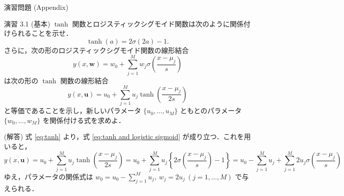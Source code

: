 \documentclass[uplatex,11pt,dvipdfmx,aspectratio=169,unicode,t]{beamer}
\numberwithin{equation}{section}
\newcommand{\bs}[1]{\boldsymbol{#1}}
\newcommand{\1}{\bs{1}}
\newcommand{\0}{\bs{0}}
\begin{document}
\begin{frame}{演習問題 (Appendix)}
    \fontsize{6.5pt}{0cm}\selectfont
    \begin{block}{演習 3.1 (基本) }
        $\tanh$ 関数とロジスティックシグモイド関数は次のように関係付けられることを示せ．
        \begin{equation} \label{eq:tanh and logistic sigmoid}
            \tanh(a) = 2\sigma(2a) - 1.
        \end{equation}
        さらに，次の形のロジスティックシグモイド関数の線形結合
        \begin{equation}
            y(x,\bs{w}) = w_{0} + \sum_{j=1}^{M} w_{j} \sigma\left(\frac{x-\mu_{j}}{s}\right)
        \end{equation}
        は次の形の $\tanh$ 関数の線形結合
        \begin{equation}
            y(x,\bs{u}) = u_{0} + \sum_{j=1}^{M} u_{j} \tanh\left(\frac{x-\mu_{j}}{2s}\right)
        \end{equation}
        と等価であることを示し，新しいパラメータ $\{u_{0},\ldots,u_{M}\}$ ともとのパラメータ $\{w_{0},\ldots,w_{M}\}$ を関係付ける式を求めよ．
    \end{block}
    (解答) 式 \eqref{eq:tanh} より，式 \eqref{eq:tanh and logistic sigmoid} が成り立つ．これを用いると，
    \begin{equation}
        y(x,\bs{u}) = u_{0} + \sum_{j=1}^{M} u_{j} \tanh\left(\frac{x-\mu_{j}}{2s}\right) = u_{0} + \sum_{j=1}^{M} u_{j} \left\{2\sigma\left(\frac{x-\mu_{j}}{s}\right) - 1\right\} = u_{0} - \sum_{j=1}^{M} u_{j} + \sum_{j=1}^{M} 2 u_{j} \sigma\left(\frac{x-\mu_{j}}{s}\right)
    \end{equation}
    ゆえ，パラメータの関係式は $w_{0} = u_{0} - \sum_{j=1}^{M} u_{j},\ w_{j} = 2 u_{j}\ (j=1,\ldots,M)$ で与えられる．
\end{frame}
\end{document}
